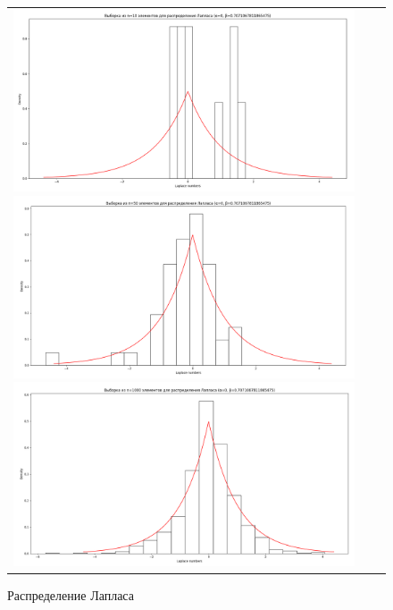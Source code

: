 \begin{figure}[H]
	\begin{tabular}{ccc}
		\includegraphics[scale=0.12]{resources/1_laplace_10.png}
		\includegraphics[scale=0.12]{resources/1_laplace_50.png}
		\includegraphics[scale=0.12]{resources/1_laplace_1000.png}
	\end{tabular}
	\caption{Распределение Лапласа}
\end{figure}

